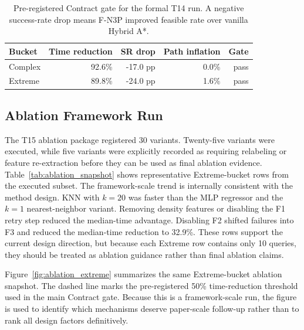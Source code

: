 \documentclass[11pt,a4paper]{article}
\begin{document}
\begin{table}[t]
\centering
\caption{Pre-registered Contract gate for the formal T14 run. A negative success-rate drop means F-N3P improved feasible rate over vanilla Hybrid A*.}
\label{tab:contract_gate}
\small
\begin{tabular}{lrrrr}
\toprule
Bucket & Time reduction & SR drop & Path inflation & Gate \\
\midrule
Complex & 92.6\% & -17.0 pp & 0.0\% & pass \\
Extreme & 89.8\% & -24.0 pp & 1.6\% & pass \\
\bottomrule
\end{tabular}
\end{table}

\subsection{Ablation Framework Run}
\label{sec:results_ablation}

The T15 ablation package registered 30 variants. Twenty-five variants were executed, while five variants were explicitly recorded as requiring relabeling or feature re-extraction before they can be used as final ablation evidence. Table~\ref{tab:ablation_snapshot} shows representative Extreme-bucket rows from the executed subset. The framework-scale trend is internally consistent with the method design. KNN with $k=20$ was faster than the MLP regressor and the $k=1$ nearest-neighbor variant. Removing density features or disabling the F1 retry step reduced the median-time advantage. Disabling F2 shifted failures into F3 and reduced the median-time reduction to 32.9\%. These rows support the current design direction, but because each Extreme row contains only 10 queries, they should be treated as ablation guidance rather than final ablation claims.

Figure~\ref{fig:ablation_extreme} summarizes the same Extreme-bucket ablation snapshot. The dashed line marks the pre-registered 50\% time-reduction threshold used in the main Contract gate. Because this is a framework-scale run, the figure is used to identify which mechanisms deserve paper-scale follow-up rather than to rank all design factors definitively.
\end{document}
